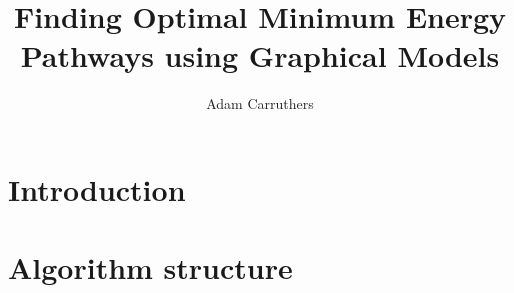 \documentclass[11pt]{report}
\title{Finding Optimal Minimum Energy Pathways using Graphical Models}
\author{Adam Carruthers}
\begin{document}
    

    \chapter{Introduction}
    \label{ch:into}
    

    \chapter{Algorithm structure}
    \label{ch:algo_struct}
    
\end{document}
